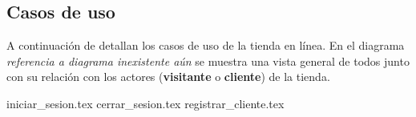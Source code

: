 %
%

\subsection{Casos de uso}

A continuación de detallan los casos de uso de la tienda en línea. En el
diagrama \textit{referencia a diagrama inexistente aún} se muestra una vista
general de todos junto con su relación con los actores (\textbf{visitante} o
\textbf{cliente}) de la tienda.


{iniciar_sesion.tex}
{cerrar_sesion.tex}
{registrar_cliente.tex}
